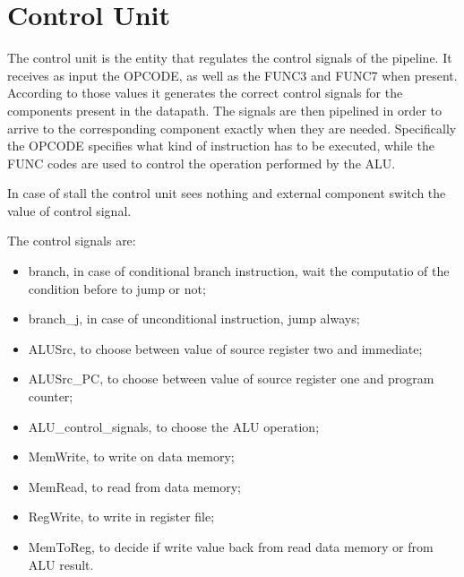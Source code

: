 %
\chapter{Control Unit}
\label{cha3}
The control unit is the entity that regulates the control signals of the pipeline. It receives as input the OPCODE, as well as the FUNC3 and FUNC7 when present. 
According to those values it generates the correct control signals for the components present in the datapath. The signals are then pipelined in order to 
arrive to the corresponding component exactly when they are needed. Specifically the OPCODE specifies what kind of instruction has to be executed, while the
FUNC codes are used to control the operation performed by the ALU.

In case of stall the control unit sees nothing and external component switch the value of control signal.

The control signals are:
\begin{itemize}
    \item branch, in case of conditional branch instruction, wait the computatio of the condition before to jump or not;
    \item branch\_j, in case of unconditional instruction, jump always;
    \item ALUSrc, to choose between value of source register two and immediate;
    \item ALUSrc\_PC, to choose between value of source register one and program counter;
    \item ALU\_control\_signals, to choose the ALU operation;
    \item MemWrite, to write on data memory;
    \item MemRead, to read from data memory;
    \item RegWrite, to write in register file;
    \item MemToReg, to decide if write value back from read data memory or from ALU result.
\end{itemize}



